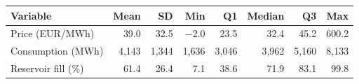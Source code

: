 \begin{tabular}{lrrrrrrr}
\toprule
Variable & Mean & SD & Min & Q1 & Median & Q3 & Max \\
\midrule
Price (EUR/MWh) & 39.0 & 32.5 & \ensuremath{-}2.0 & 23.5 & 32.4 & 45.2 & 600.2 \\
Consumption (MWh) & 4{,}143 & 1{,}344 & 1{,}636 & 3{,}046 & 3{,}962 & 5{,}160 & 8{,}133 \\
Reservoir fill (\%) & 61.4 & 26.4 & 7.1 & 38.6 & 71.9 & 83.1 & 99.8 \\
\bottomrule
\end{tabular}

